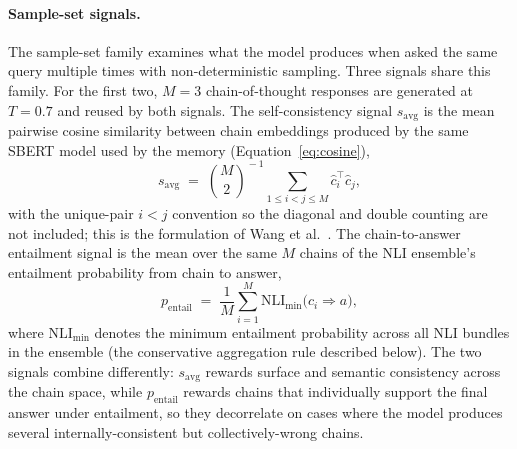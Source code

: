 \paragraph{Sample-set signals.}
The sample-set family examines what the model produces when asked the same query multiple times with non-deterministic sampling. Three signals share this family. For the first two, $M = 3$ chain-of-thought responses are generated at $T = 0.7$ and reused by both signals. The self-consistency signal $s_{\text{avg}}$ is the mean pairwise cosine similarity between chain embeddings produced by the same SBERT model used by the memory (Equation~\ref{eq:cosine}),
\begin{equation}
s_{\text{avg}} \;=\; \binom{M}{2}^{\!-1}\sum_{1 \leq i < j \leq M} \hat{c}_{i}^{\top} \hat{c}_{j},
\label{eq:savg}
\end{equation}
with the unique-pair $i < j$ convention so the diagonal and double counting are not included; this is the formulation of Wang et al.~\cite{wang2023selfconsistency}. The chain-to-answer entailment signal is the mean over the same $M$ chains of the NLI ensemble's entailment probability from chain to answer,
\begin{equation}
p_{\text{entail}} \;=\; \frac{1}{M}\sum_{i=1}^{M} \mathrm{NLI}_{\min}\bigl(c_{i} \Rightarrow a\bigr),
\label{eq:pentail}
\end{equation}
where $\mathrm{NLI}_{\min}$ denotes the minimum entailment probability across all NLI bundles in the ensemble (the conservative aggregation rule described below). The two signals combine differently: $s_{\text{avg}}$ rewards surface and semantic consistency across the chain space, while $p_{\text{entail}}$ rewards chains that individually support the final answer under entailment, so they decorrelate on cases where the model produces several internally-consistent but collectively-wrong chains.

